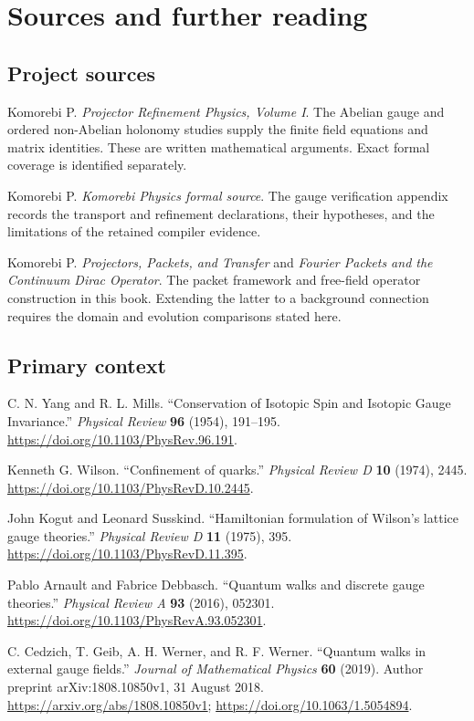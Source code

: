 \section*{Sources and further reading}
\subsection*{Project sources}
\begin{enumerate}[label={[P\arabic*]},leftmargin=2.5em]
\item Komorebi P. \emph{Projector Refinement Physics, Volume I}. The Abelian gauge and ordered non-Abelian holonomy studies supply the finite field equations and matrix identities. These are written mathematical arguments. Exact formal coverage is identified separately.
\item Komorebi P. \emph{Komorebi Physics formal source}. The gauge verification appendix records the transport and refinement declarations, their hypotheses, and the limitations of the retained compiler evidence.
\item Komorebi P. \emph{Projectors, Packets, and Transfer} and \emph{Fourier Packets and the Continuum Dirac Operator}. The packet framework and free-field operator construction in this book. Extending the latter to a background connection requires the domain and evolution comparisons stated here.
\end{enumerate}

\subsection*{Primary context}
\begin{enumerate}[label={[C\arabic*]},leftmargin=2.5em]
\item C. N. Yang and R. L. Mills. ``Conservation of Isotopic Spin and Isotopic Gauge Invariance.'' \emph{Physical Review} \textbf{96} (1954), 191--195. \url{https://doi.org/10.1103/PhysRev.96.191}.
\item Kenneth G. Wilson. ``Confinement of quarks.'' \emph{Physical Review D} \textbf{10} (1974), 2445. \url{https://doi.org/10.1103/PhysRevD.10.2445}.
\item John Kogut and Leonard Susskind. ``Hamiltonian formulation of Wilson's lattice gauge theories.'' \emph{Physical Review D} \textbf{11} (1975), 395. \url{https://doi.org/10.1103/PhysRevD.11.395}.
\item Pablo Arnault and Fabrice Debbasch. ``Quantum walks and discrete gauge theories.'' \emph{Physical Review A} \textbf{93} (2016), 052301. \url{https://doi.org/10.1103/PhysRevA.93.052301}.
\item C. Cedzich, T. Geib, A. H. Werner, and R. F. Werner. ``Quantum walks in external gauge fields.'' \emph{Journal of Mathematical Physics} \textbf{60} (2019). Author preprint arXiv:1808.10850v1, 31 August 2018. \url{https://arxiv.org/abs/1808.10850v1}; \url{https://doi.org/10.1063/1.5054894}.
\end{enumerate}

